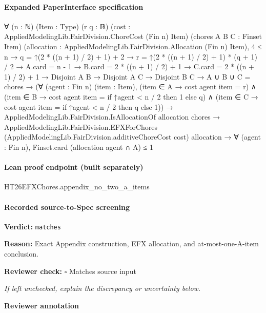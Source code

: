 \documentclass[10pt]{article}
\newcommand{\reviewerbox}{%
  \par\noindent\fbox{\parbox{0.96\linewidth}{\rule{0pt}{0.38in}}}\par
}
\newcommand{\reviewmatch}[1]{%
  \par\noindent\textbf{Reviewer check:} $\square$\; #1\par
  \noindent\emph{If left unchecked, explain the discrepancy or uncertainty below.}\par
}
\begin{document}
\paragraph{Expanded PaperInterface specification}
\begin{ReviewVerbatim}
∀ (n : ℕ) (Item : Type) (r q : ℝ) (cost : AppliedModelingLib.FairDivision.ChoreCost (Fin n) Item)
  (chores A B C : Finset Item) (allocation : AppliedModelingLib.FairDivision.Allocation (Fin n) Item),
  4 ≤ n →
    q = ↑(2 * ((n + 1) / 2) + 1) + 2 →
      r = ↑(2 * ((n + 1) / 2) + 1) * (q + 1) / 2 →
        A.card = n - 1 →
          B.card = 2 * ((n + 1) / 2) + 1 →
            C.card = 2 * ((n + 1) / 2) + 1 →
              Disjoint A B →
                Disjoint A C →
                  Disjoint B C →
                    A ∪ B ∪ C = chores →
                      (∀ (agent : Fin n) (item : Item),
                          (item ∈ A → cost agent item = r) ∧
                            (item ∈ B → cost agent item = if ↑agent < n / 2 then 1 else q) ∧
                              (item ∈ C → cost agent item = if ↑agent < n / 2 then q else 1)) →
                        AppliedModelingLib.FairDivision.IsAllocationOf allocation chores →
                          AppliedModelingLib.FairDivision.EFXForChores
                              (AppliedModelingLib.FairDivision.additiveChoreCost cost) allocation →
                            ∀ (agent : Fin n), Finset.card (allocation agent ∩ A) ≤ 1
\end{ReviewVerbatim}



\paragraph{Lean proof endpoint (built separately)}\begin{ReviewVerbatim}
HT26EFXChores.appendix_no_two_a_items
\end{ReviewVerbatim}

\paragraph{Recorded source-to-Spec screening}
\textbf{Verdict:} \texttt{matches}
\\
{\raggedright
\textbf{Reason:} Exact Appendix construction, EFX allocation, and at-\allowbreak{}most-\allowbreak{}one-\allowbreak{}A-\allowbreak{}item conclusion.\allowbreak{}
\par}
\reviewmatch{Matches source input}
\noindent\textbf{Reviewer annotation}\par
\reviewerbox
\clearpage
\hypertarget{source-claim-18b6e05d84d21367}{}
\end{document}

